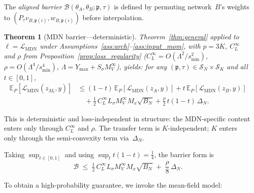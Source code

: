 \documentclass[11pt]{article}
\newtheorem{theorem}{Theorem}[section]
\newcommand{\E}{\mathbb{E}}
\newcommand{\cL}{\mathcal{L}}
\newcommand{\cS}{\mathcal{S}}
\newcommand{\cB}{\mathcal{B}}
\newcommand{\nperm}{\mathfrak{p}}  %
\begin{document}
\noindent
The \emph{aligned barrier} $\cB(\theta_A,\theta_B;\nperm,\tau)$ is
defined by permuting network~$B$'s weights to
$(P_\tau v_{B,\nperm(i)}, w_{B,\nperm(i)})$ before interpolation.

\begin{theorem}[MDN barrier---deterministic]\label{thm:main}
Theorem~\ref{thm:general} applied to $\ell = \cL_{\mathrm{MDN}}$
under Assumptions~\ref{ass:arch}--\ref{ass:input_mom}, with
$p = 3K$,
$C_L^\infty$ and $\rho$ from
Proposition~\ref{prop:loss_regularity}
($C_L^\infty = O(\Lambda^2/s_{\min}^2)$,
$\rho = O(\Lambda^4/s_{\min}^4)$,
$\Lambda = Y_{\max} + S_\sigma M_V^\infty$),
yields: for any $(\nperm,\tau) \in \cS_N \times \cS_K$
and all $t \in [0,1]$,
\begin{equation}\label{eq:main_bound}
  \begin{aligned}
  \E_P[\cL_{\mathrm{MDN}}(z_{M_t}, y)]
  &\le (1-t)\,\E_P[\cL_{\mathrm{MDN}}(z_A, y)]
  + t\,\E_P[\cL_{\mathrm{MDN}}(z_B, y)]\\
  &\quad + \tfrac{1}{2}\,C_L^\infty L_\sigma M_V^\infty M_x \sqrt{B_N}
  + \tfrac{\rho}{2}\,t(1-t)\,\Delta_N.
  \end{aligned}
\end{equation}
\end{theorem}

This is deterministic and loss-independent in structure: the
MDN-specific content enters only through $C_L^\infty$ and $\rho$.
The transfer term is $K$-independent;
$K$ enters only through the semi-convexity term via~$\Delta_N$.

Taking $\sup_{t\in[0,1]}$ and using $\sup_t t(1-t) = \tfrac{1}{4}$, the barrier form is
\begin{equation}\label{eq:barrier_form}
  \cB \;\le\; \tfrac{1}{2}\,C_L^\infty L_\sigma M_V^\infty M_x \sqrt{B_N}
  \;+\; \frac{\rho}{8}\,\Delta_N.
\end{equation}

To obtain a high-probability guarantee, we invoke the mean-field model:
\end{document}
